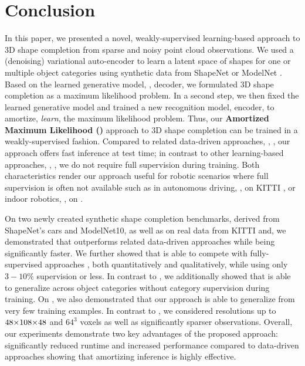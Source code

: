 \section{Conclusion}
\label{sec:conclusion}

In this paper, we presented a novel, weakly-supervised learning-based approach to 3D shape completion from sparse and noisy point cloud observations. We used a (denoising) variational auto-encoder \citep{Im2017AAAI,Kingma2014ICLR} to learn a latent space of shapes for one or multiple object categories using synthetic data from ShapeNet \citep{Chang2015ARXIV} or ModelNet \citep{Wu2015CVPR}. Based on the learned generative model, \ie, decoder, we formulated 3D shape completion as a maximum likelihood problem. In a second step, we then fixed the learned generative model and trained a new recognition model, \ie encoder, to amortize, \ie \emph{learn}, the maximum likelihood problem. Thus, our {\bf Amortized Maximum Likelihood (\AML)} approach to 3D shape completion can be trained in a weakly-supervised fashion. Compared to related data-driven approaches, \eg, \citep{Rock2015CVPR,Haene2014CVPR,Li2015CGF,Engelmann2016GCPR,Engelmann2017WACV,Nan2012TG,Bao2013CVPR,Dame2013CVPR,Ngyuen2016CVPR}, our approach offers fast inference at test time; in contrast to other learning-based approaches, \eg, \citep{Riegler2017THREEDV,Smith2017ARXIV,Dai2017CVPRa,Sharma2016ARXIV,Fan2017CVPR,Rezende2016ARXIV,Yang2018ARXIVb,Wang2017ICCV,Varley2017IROS,Han2017ICCV}, we do not require full supervision during training. Both characteristics render our approach useful for robotic scenarios where full supervision is often not available such as in autonomous driving, \eg, on KITTI \citep{Geiger2012CVPR}, or indoor robotics, \eg, on \Kinect \citep{Yang2018ARXIVb}.

On two newly created synthetic shape completion benchmarks, derived from ShapeNet's cars and ModelNet10, as well as on real data from KITTI and, we demonstrated that \AML outperforms related data-driven approaches \citep{Engelmann2016GCPR,Gupta2015CVPR} while being significantly faster. We further showed that \AML is able to compete with fully-supervised approaches \citep{Dai2017CVPRa}, both quantitatively and qualitatively, while using only $3-10\%$ supervision or less. In contrast to \citep{Rock2015CVPR,Haene2014CVPR,Li2015CGF,Engelmann2016GCPR,Engelmann2017WACV,Nan2012TG,Bao2013CVPR,Dame2013CVPR}, we additionally showed that \AML is able to generalize across object categories without category supervision during training. On \Kinect, we also demonstrated that our \AML approach is able to generalize from very few training examples. In contrast to \citep{Girdhar2016ECCV,Liu2017ARXIV,Sharma2016ARXIV,Wu2015CVPR,Dai2017CVPRa,Firman2016CVPR,Han2017ICCV,Fan2017CVPR}, we considered resolutions up to $48 \operatorname*{\!\times\!} 108 \operatorname*{\!\times\!} 48$ and $64^3$ voxels as well as significantly sparser observations. Overall, our experiments demonstrate two key advantages of the proposed approach: significantly reduced runtime and increased performance compared to data-driven approaches showing that amortizing inference is highly effective.

